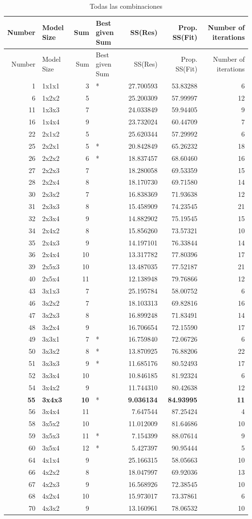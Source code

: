 \documentclass[
  spanish,
]{article}
\begin{document}
\begin{longtable}[]{@{}rlrlrrr@{}}
\caption{Todas las combinaciones}\tabularnewline
\toprule
Number & Model Size & Sum & Best given Sum & SS(Res) & Prop. SS(Fit) & Number of iterations\tabularnewline
\midrule
\endfirsthead
\toprule
Number & Model Size & Sum & Best given Sum & SS(Res) & Prop. SS(Fit) & Number of iterations\tabularnewline
\midrule
\endhead
1 & 1x1x1 & 3 & * & 27.700593 & 53.83288 & 6\tabularnewline
6 & 1x2x2 & 5 & & 25.200309 & 57.99997 & 12\tabularnewline
11 & 1x3x3 & 7 & & 24.033849 & 59.94405 & 9\tabularnewline
16 & 1x4x4 & 9 & & 23.732024 & 60.44709 & 7\tabularnewline
22 & 2x1x2 & 5 & & 25.620344 & 57.29992 & 6\tabularnewline
25 & 2x2x1 & 5 & * & 20.842849 & 65.26232 & 18\tabularnewline
26 & 2x2x2 & 6 & * & 18.837457 & 68.60460 & 16\tabularnewline
27 & 2x2x3 & 7 & & 18.280058 & 69.53359 & 15\tabularnewline
28 & 2x2x4 & 8 & & 18.170730 & 69.71580 & 14\tabularnewline
30 & 2x3x2 & 7 & & 16.838369 & 71.93638 & 12\tabularnewline
31 & 2x3x3 & 8 & & 15.458909 & 74.23545 & 21\tabularnewline
32 & 2x3x4 & 9 & & 14.882902 & 75.19545 & 15\tabularnewline
34 & 2x4x2 & 8 & & 15.856260 & 73.57321 & 10\tabularnewline
35 & 2x4x3 & 9 & & 14.197101 & 76.33844 & 14\tabularnewline
36 & 2x4x4 & 10 & & 13.317782 & 77.80396 & 17\tabularnewline
39 & 2x5x3 & 10 & & 13.487035 & 77.52187 & 21\tabularnewline
40 & 2x5x4 & 11 & & 12.138948 & 79.76866 & 12\tabularnewline
43 & 3x1x3 & 7 & & 25.195784 & 58.00752 & 6\tabularnewline
46 & 3x2x2 & 7 & & 18.103313 & 69.82816 & 16\tabularnewline
47 & 3x2x3 & 8 & & 16.899248 & 71.83491 & 14\tabularnewline
48 & 3x2x4 & 9 & & 16.706654 & 72.15590 & 17\tabularnewline
49 & 3x3x1 & 7 & * & 16.759840 & 72.06726 & 6\tabularnewline
50 & 3x3x2 & 8 & * & 13.870925 & 76.88206 & 22\tabularnewline
51 & 3x3x3 & 9 & * & 11.685176 & 80.52493 & 17\tabularnewline
52 & 3x3x4 & 10 & & 10.846185 & 81.92324 & 6\tabularnewline
54 & 3x4x2 & 9 & & 11.744310 & 80.42638 & 12\tabularnewline
\textbf{55} & \textbf{3x4x3} & \textbf{10} & * & \textbf{9.036134} & \textbf{84.93995} & \textbf{11}\tabularnewline
56 & 3x4x4 & 11 & & 7.647544 & 87.25424 & 4\tabularnewline
58 & 3x5x2 & 10 & & 11.012009 & 81.64686 & 10\tabularnewline
59 & 3x5x3 & 11 & * & 7.154399 & 88.07614 & 9\tabularnewline
60 & 3x5x4 & 12 & * & 5.427397 & 90.95444 & 5\tabularnewline
64 & 4x1x4 & 9 & & 25.166315 & 58.05663 & 10\tabularnewline
66 & 4x2x2 & 8 & & 18.047997 & 69.92036 & 13\tabularnewline
67 & 4x2x3 & 9 & & 16.568926 & 72.38545 & 10\tabularnewline
68 & 4x2x4 & 10 & & 15.973017 & 73.37861 & 6\tabularnewline
70 & 4x3x2 & 9 & & 13.160961 & 78.06532 & 10\tabularnewline

\end{longtable}
\end{document}
